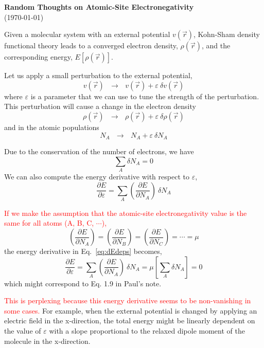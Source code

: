 \documentclass[aip,jcp,preprint,superscriptaddress,amsmath,amssymb]{revtex4-1}
\begin{document}
\begin{center}
\textbf{Random Thoughts on Atomic-Site Electronegativity}  \\
(\today)
\end{center}
Given a molecular system with an external potential $v(\vec{r})$, 
Kohn-Sham density functional theory leads to a converged electron density, $\rho(\vec{r})$,
and the corresponding energy, $E[\rho(\vec{r})]$. 

Let us apply a small perturbation to the external potential,
\begin{equation}
v(\vec{r}) ~~~ \longrightarrow ~~~ v(\vec{r})  + \varepsilon ~\delta v(\vec{r}) 
\end{equation}
where $\varepsilon$ is a parameter that we can use to tune the strength of the perturbation.  
This perturbation will cause a change in the electron density
\begin{equation}
\rho(\vec{r}) ~~~ \longrightarrow ~~~ \rho(\vec{r})  + \varepsilon ~\delta \rho(\vec{r}) 
\end{equation}
and in the atomic populations 
\begin{equation}
N_A~~~ \longrightarrow ~~~ N_A + \varepsilon ~\delta N_A 
\end{equation}

Due to the conservation of the number of electrons, we have
\begin{equation}
\sum_A \delta N_A = 0 
\end{equation}
We can also  compute the energy derivative with respect to $\varepsilon$,
\begin{equation}
\frac { \partial E} { \partial \varepsilon}  = \sum_A  \left( \frac{\partial E} { \partial N_A } \right) ~ \delta N_A   \label{eq:dEdeps} 
\end{equation}

\textcolor{red}{If we make the assumption that the atomic-site electronegativity value is the same for all atoms (A, B, C, $\cdots$),} 
\begin{equation}
\left( \frac{\partial E} { \partial N_A } \right)  =  \left( \frac{\partial E} { \partial N_B } \right)   = \left( \frac{\partial E} { \partial N_C } \right) = \cdots = \mu 
\end{equation} 
 the energy derivative in Eq.~\ref{eq:dEdeps} becomes,
\begin{equation}
\frac { \partial E} { \partial \varepsilon}  = \sum_A  \left( \frac{\partial E} { \partial N_A } \right)  ~ \delta N_A = \mu  \left[ \sum_A   \delta N_A \right] = 0
\end{equation}
which might correspond to Eq. 1.9 in Paul's note. 

\textcolor{red}{This is perplexing because this energy derivative seems to be non-vanishing in some cases.}    
For example, when the external potential is changed by applying an electric field in the x-direction, 
the total energy might be linearly dependent on the value of $\varepsilon$ with a slope proportional to the relaxed dipole moment of the molecule in the x-direction. 

%
\end{document}
